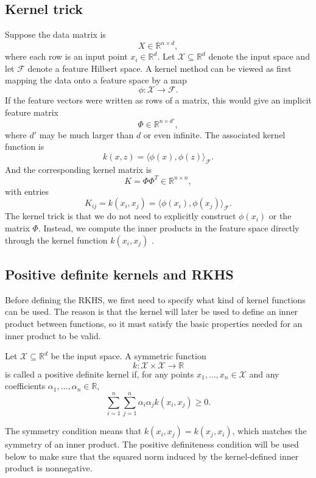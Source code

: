 \subsection{Kernel trick}
Suppose the data matrix is
\[
X\in\mathbb R^{n\times d},
\]
where each row is an input point $x_i\in\mathbb R^d$. Let $\mathcal X\subseteq\mathbb R^d$ denote the input space and let $\mathcal F$ denote a feature Hilbert space. A kernel method can be viewed as first mapping the data onto a feature space by a map
\[
\phi:\mathcal X\to\mathcal F.
\]
If the feature vectors were written as rows of a matrix, this would give an implicit feature matrix
\[
\Phi\in\mathbb R^{n\times d'},
\]
where $d'$ may be much larger than $d$ or even infinite. The associated kernel function is
\[
k(x,z)=\langle\phi(x),\phi(z)\rangle_{\mathcal F}.
\] 
And the corresponding kernel matrix is
\[
K=\Phi\Phi^T\in\mathbb R^{n\times n},
\]
with entries
\[
K_{ij}=k(x_i,x_j)=\langle \phi(x_i),\phi(x_j)\rangle_{\mathcal F}.
\]
The kernel trick is that we do not need to explicitly construct $\phi(x_i)$ or the matrix $\Phi$. Instead, we compute the inner products in the feature space directly through the kernel function $k(x_i,x_j)$ \citep{hofmann2008kernel}. 

\subsection{Positive definite kernels and RKHS}

Before defining the RKHS, we first need to specify what kind of kernel functions can be used. The reason is that the kernel will later be used to define an inner product between functions, so it must satisfy the basic properties needed for an inner product to be valid. 

\begin{definition}
Let $\mathcal X\subseteq\mathbb{R}^d$ be the input space. A symmetric function
\[
k:\mathcal X\times\mathcal X\to\mathbb{R}
\]
is called a positive definite kernel if, for any points $x_1,\ldots,x_n\in\mathcal X$ and any coefficients $\alpha_1,\ldots,\alpha_n\in\mathbb{R}$,
\[
\sum_{i=1}^n\sum_{j=1}^n\alpha_i\alpha_j k(x_i,x_j)\geq0.
\]
\end{definition}

The symmetry condition means that $k(x_i,x_j)=k(x_j,x_i)$, which matches the symmetry of an inner product. The positive definiteness condition will be used below to make sure that the squared norm induced by the kernel-defined inner product is nonnegative. 


